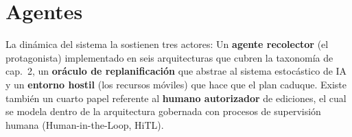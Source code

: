 \section{Agentes}

La dinámica del sistema la sostienen tres actores: Un \textbf{agente recolector} (el protagonista) implementado en seis arquitecturas que cubren la taxonomía de \textcite{russellNorvig2020} cap.~2, un \textbf{oráculo de replanificación} que abstrae al sistema estocástico de IA y un \textbf{entorno hostil} (los recursos móviles) que hace que el plan caduque. Existe también un cuarto papel referente al \textbf{humano autorizador} de ediciones, el cual se modela dentro de la arquitectura gobernada con procesos de supervisión humana (Human-in-the-Loop, HiTL).

